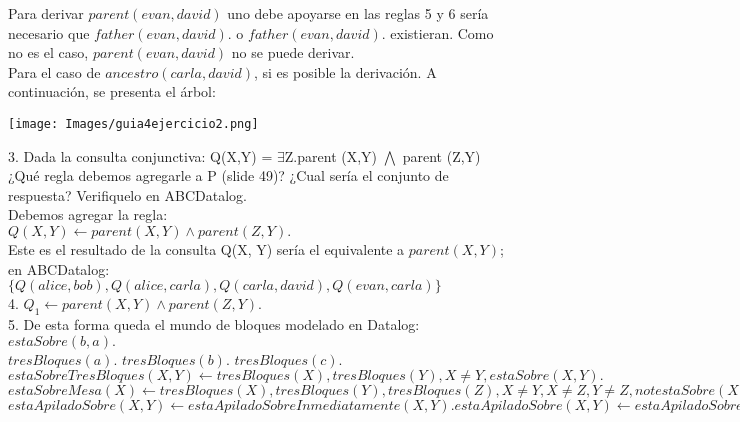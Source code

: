 Para derivar $parent(evan, david)$ uno debe apoyarse en las reglas 5 y 6 sería necesario que $father(evan, david).$ o $father(evan, david).$ existieran. Como no es el caso, $parent(evan, david)$ no se puede derivar. \\

Para el caso de $ancestro(carla, david)$, si es posible la derivación. A continuación, se presenta el árbol: \\

\begin{center}
	\texttt{[image: Images/guia4ejercicio2.png]}
	\label{fig:overview}
\end{center}



3. Dada la consulta conjunctiva: Q(X,Y) = $\exists$Z.parent (X,Y) $\bigwedge$ parent (Z,Y) ¿Qué regla debemos agregarle a P (slide 49)? ¿Cual sería el conjunto de respuesta? Verifiquelo en ABCDatalog.\\

Debemos agregar la regla:\\

$Q(X, Y) \gets parent(X, Y) \land parent(Z, Y).$\\

Este es el resultado de la consulta Q(X, Y) sería el equivalente a $parent(X, Y)$; en ABCDatalog: \\

$\{Q(alice, bob), Q(alice, carla), Q(carla, david), Q(evan, carla)\}$ \\

4. $Q_{1} \gets parent(X, Y) \land parent(Z, Y).$\\

5. De esta forma queda el mundo de bloques modelado en Datalog: \\

$estaSobre(b, a).$\\

$tresBloques(a).$
$tresBloques(b).$
$tresBloques(c).$\\

$estaSobreTresBloques(X, Y) \gets tresBloques(X), tresBloques(Y), X \neq Y, estaSobre(X, Y).$ \\

$estaSobreMesa(X) \gets tresBloques(X), tresBloques(Y), tresBloques(Z), X \neq Y,  X \neq Z, Y \neq Z, not estaSobre(X, Y), not estaSobre(X, Z).$\\

$estaApiladoSobre(X, Y) \gets estaApiladoSobreInmediatamente(X, Y).
estaApiladoSobre(X, Y) \gets estaApiladoSobre(X, Z), estaApiladoSobre(Z, Y).$\\


